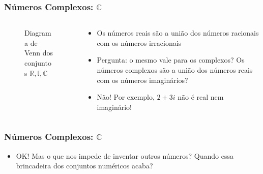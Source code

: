 \documentclass[usenames,dvipsnames,svgnames]{beamer}
\begin{document}
\begin{frame}
	\frametitle{Números Complexos: $\mathbb{C}$}

	\begin{columns}[t]
	\begin{column}{.6\textwidth}
		\begin{figure}
			\def\Rcircle{		(-1cm,0) circle (0.5cm)}
			\def\Icircle{		(1cm,0) circle (0.5cm)}
			\def\Ccircle{		(0,0) circle (1.75cm)}

			\caption{\small Diagrama de Venn dos conjuntos $\mathbb{R}, \mathbb{I}, \mathbb{C}$}
		\end{figure}
	\end{column}
	\begin{column}{.6\textwidth}
		\begin{itemize}
		\small
		\item Os números reais são a união dos números racionais com os números irracionais
		\item Pergunta: o mesmo vale para os complexos? Os números complexos são a união dos números reais com os números imaginários?
		\item {\color{red}Não! Por exemplo, $2 + 3i$ não é real nem imaginário!}
		\end{itemize}
	\end{column}
	\end{columns}

\end{frame}

\begin{frame}
	\frametitle{Números Complexos: $\mathbb{C}$}

	\begin{itemize}
		\item OK! Mas o que nos impede de inventar outros números? Quando essa brincadeira dos conjuntos numéricos acaba?
	\end{itemize}

\end{frame}
\end{document}
